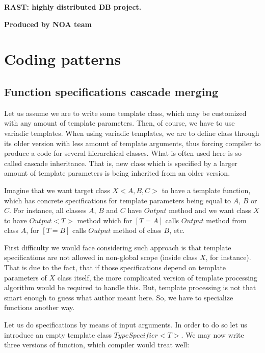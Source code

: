 \documentclass{article}
\begin{document}

\begin{center}
 \Large{\bf RAST: highly distributed DB project.}

{\large {\bf Produced by NOA team}}
\end{center}

\tableofcontents

\newpage
\section{Coding patterns}
\subsection{Function specifications cascade merging}
\label{subsec:specifications_cascade_merging}

Let us assume we are to write some template class, which may be customized with any amount of template parameters. Then, of course, we have to use variadic templates. When using variadic templates, we are to define class through its older version with less amount of template arguments, thus forcing compiler to produce a code for several hierarchical classes. What is often used here is so called cascade inheritance. That is, new class which is specified by a larger amount of template parameters is being inherited from an older version.

Imagine that we want target class $X<A,B,C>$ to have a template function, which has concrete specifications for template parameters being equal to $A$, $B$ or $C$. For instance, all classes $A$, $B$ and $C$ have $Output$ method and we want class $X$ to have $Output<T>$ method which for $[T=A]$ calls $Output$ method from class $A$, for $[T=B]$ calls $Output$ method of class $B$, etc.

First difficulty we would face considering such approach is that template specifications are not allowed in non-global scope (inside class $X$, for instance). That is due to the fact, that if those specifications depend on template parameters of $X$ class itself, the more complicated version of template processing algorithm would be required to handle this. But, template processing is not that smart enough to guess what author meant here. So, we have to specialize functions another way.

Let us do specifications by means of input arguments. In order to do so let us introduce an empty template class $TypeSpecifier<T>$. We may now write three versions of function, which compiler would treat well:
\end{document}
